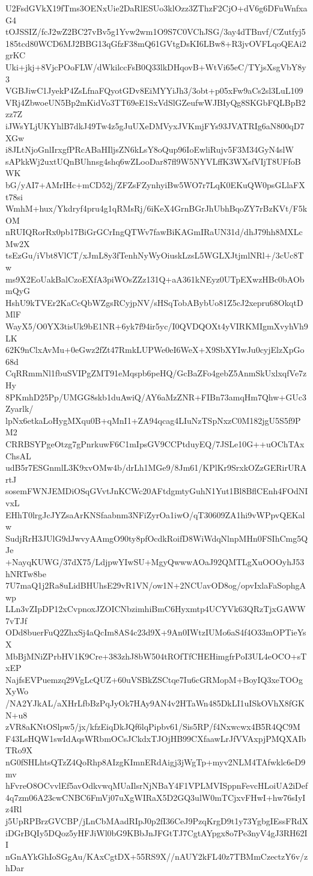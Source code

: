 U2FsdGVkX19fTms3OENxUie2DaRlESUo3klOzz3ZThzF2CjO+dV6g6DFuWnfxaG4
tOJSSIZ/fcJ2wZ2BC27vBv5g1Yvw2wm1O9S7C0VChJSG/3ay4dTBnvf/CZutfyj5
185tcd80WCD6MJ2BBG13qGfzF38mQ61GVtgDsKI6LBw8+R3jvOVFLqoQEAi2grKC
Uki+jkj+8VjcPOoFLW/dWkilccFsB0Q33lkDHqovB+WtVi65eC/TYjsXsgVbY8y3
VGBJiwC1JyekP4ZsLfnaFQyotGDv8EiMYYiJh3/3obt+p05xFw9aCs2sl3LuL109
VRj4ZbwoeUN5Bp2mKidVo3TT69eE1SxVdSlGZeufwWJBIyQg8SKGbFQLBpB2zz7Z
iJWsYLjUKYhlB7dkJ49Tw4z5gJuUXeDMVyxJVKmjFYs93JVATRIg6aN800qD7XGw
i8JLtNjoGnlIrxgfPRcABaHIljsZN6kLsY8oQup96IoEwliRujv5F3M34GyN4slW
sAPkkWj2uxtUQnBUhnsg4shq6wZLooDar87fl9W5NYVLffK3WXsfVIjT8UFfoBWK
bG/yAI7+AMrIHc+mCD52j/ZFZsFZynhyiBw5WO7r7LqK0EKuQW0psGLlaFXt78si
WmhM+hux/Ykdryf4pru4g1qRMsRj/6iKeX4GrnBGrJhUbhBqoZY7rBzKVt/F5kOM
nRUIQRorRx0pb17BiGrGCrIngQTWv7fawBiKAGmIRaUN31d/dhJ79hh8MXLcMw2X
tsEzGu/iVbt8VlCT/xJmL8y3fTenhNyWyOiuskLzsL5WGLXJtjmlNRl+/3cUc8Tw
ms9X2EoUakBalCzoEXfA3piWOsZZz131Q+aA361kNEyz0UTpEXwzHBc0bAObmQyG
HshU9kTVEr2KaCcQbWZgsRCyjpNV/sHSqTobABybUo81Z5cJ2xepru68OkqtDMlF
WayX5/O0YX3tisUk9bE1NR+6yk7f94ir5yc/I0QVDQOXt4yVIRKMIgmXvyhVh9LK
62K9nClxAvMu+0eGwz2fZt47RmkLUPWe0eI6WeX+X9SbXYIwJu0cyjElzXpGo68d
CqRRmmNl1fbuSVIPgZMT91eMqspb6peHQ/GcBaZFo4gebZ5AnmSkUxlxqfVe7zHy
8PKmhD25Pp/UMGG8skb1duAwiQ/AY6aMzZNR+FIBn73amqHm7Qhw+GUc3Zyarlk/
lpNx6etkaLoHygMXqu0B+qMnI1+ZA94qcag4LIuNzTSpNxzC0M182jgU5S5f9PM2
CRRBSYPgeOtzg7gPnrkuwF6C1mIpsGV9CCPtduyEQ/7JSLe10G++uOChTAxChsAL
udB5r7ESGnmlL3K9xvOMw4b/drLh1MGe9/8Jm61/KPlKr9SrxkOZzGERirURArtJ
sosemFWNJEMDiOSqGVvtJnKCWc20AFtdgmtyGuhN1Yut1Bl8BflCEnh4FOdNIvxL
EHhT0lrgJcJYZsaArKNSfaabnm3NFiZyrOa1iwO/qT30609ZA1hi9vWPpvQEKalw
SudjRrH3JUlG9dJwvyAAmgO90ty8pfOcdkRoifD8WiWdqNlnpMHn0FSIhCmg5QJe
+NayqKUWG/37dX75/LdjpwYIwSU+MgyQwwwAOaJ92QMTLgXuOOOyhJ53hNRTw8be
7U7maQ1j2Ra8uLidBHUhsE29vR1VN/ow1N+2NCUavOD8og/opvIxlaFaSophgAwp
LLn3vZIpDP12xCvpnoxJZOICNbzimhiBmC6Hyxmtp4UCYVk63QRzTjxGAWW7vTJf
ODd8buerFuQ2ZhxSj4aQcIm8AS4c23d9X+9An0IWtzIUMo6aS4f4O33mOPTieYsX
MbBjMNiZPrbHV1K9Cre+383zhJ8bW504tROfTfCHEHimgfrPoI3UL4eOCO+sTxEP
NajfsEVPuemzq29VgLcQUZ+60uVSBkZSCtqe7Iu6cGRMopM+BoyIQ3xeTOOgXyWo
/NA2YJkAL/aXHrLfbBzPqJyOk7HAy9AN4v2HTaWn485DkLI1uISkOVhX8fGKN+u8
zVR8aKNtOSlpw5/jx/kfzEiqDkJQf6lqPipbv61/Sis5RP/f4Nxwcwx4B5R4QC9M
F43LsHQW1swIdAqsWRbmOCsJCkdxTJOjHB99CXfaawLrJfVVAxpjPMQXAIbTRo9X
nG0fSHLhtsQTzZ4QoRhp8AIzgKImnERdAigj3jWgTp+myv2NLM4TAfwklc6eD9mv
hFvreO8OCvvlEf5avOdkvwqMUaIlsrNjNBaY4F1VPLMVISppnFevcHLoiUA2iDef
4q7zm06A23cwCNBC6FmVj07uXgWIRaX5D2GQ3ulW0mTCjxvFHwI+hw76sIyIz4Rl
j5UpRPBrzGVCBP/jLnCbMAadRIpJ0p2fI36CeJ9PzqKrgD9t1y73YgbgIEssFRdX
iDGrBQIy5DQoz5yHFJiWl0bG9KBbJnJFGtTJ7CgtAYpgx8o7Pe3nyV4gJ3RH62II
nGnAYkGhIoSGgAu/KAxCgtDX+55RS9X//nAUY2kFL40z7TBMmCzectzY6v/zhDar
